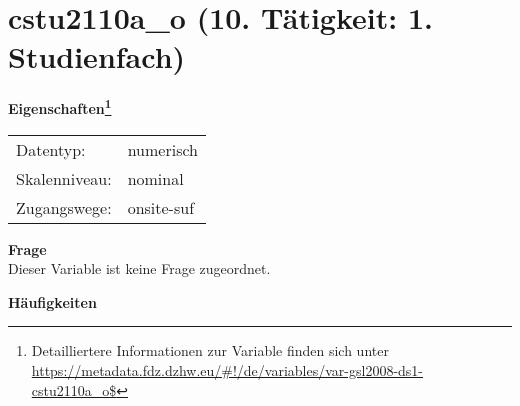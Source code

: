 
    \setcounter{footnote}{0}

    \vspace*{-1.8cm}
	\section{cstu2110a\_o (10. Tätigkeit: 1. Studienfach)}
	\label{section:cstu2110a_o}



    \vspace*{0.5cm}
    \noindent\textbf{Eigenschaften\footnote{Detailliertere Informationen zur Variable finden sich unter
		\url{https://metadata.fdz.dzhw.eu/\#!/de/variables/var-gsl2008-ds1-cstu2110a_o$}}}\\
	\begin{tabularx}{\hsize}{@{}lX}
	Datentyp: & numerisch \\
	Skalenniveau: & nominal \\
	Zugangswege: &
	  onsite-suf
 \\
    \end{tabularx}



		\vspace*{0.5cm}
		\noindent\textbf{Frage}\\
		Dieser Variable ist keine Frage zugeordnet.





        		\vspace*{0.5cm}
                \noindent\textbf{Häufigkeiten}

